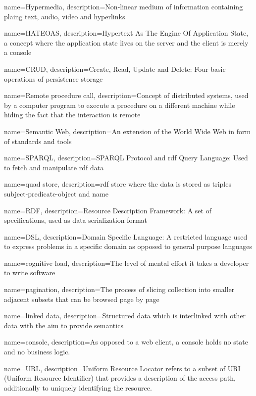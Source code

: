 {
    name={Hypermedia},
    description={Non-linear medium of information containing plaing text, audio, video and hyperlinks}
}

{
    name={HATEOAS},
    description={Hypertext As The Engine Of Application State, a concept where the application state lives on the server and the client is merely a \gls{console}}
}

{
    name={CRUD},
    description={Create, Read, Update and Delete: Four basic operations of persistence storage}
}

{
    name={Remote procedure call},
    description={Concept of distributed systems, used by a computer program to execute a procedure on a different machine while hiding the fact that the interaction is remote}
}

{
    name={Semantic Web},
    description={An extension of the World Wide Web in form of standards and tools}
}

{
    name={SPARQL},
    description={SPARQL Protocol and \gls{rdf} Query Language: Used to fetch and manipulate \gls{rdf} data}
}

{
    name={quad store},
    description={\gls{rdf} store where the data is stored as triples subject-predicate-object and name}
}

{
    name={RDF},
    description={Resource Description Framework: A set of specifications, used as data serialization format}
}

{
    name={DSL},
    description={Domain Specific Language: A restricted language used to express problems in a specific domain as opposed to general purpose languages}
}

{
    name={cognitive load},
    description={The level of mental effort it takes a developer to write software}
}

{
    name={pagination},
    description={The process of slicing collection into smaller adjacent subsets that can be browsed page by page}
}

{
    name={linked data},
    description={Structured data which is interlinked with other data with the aim to provide semantics}
}

{
    name={console},
    description={As opposed to a web client, a console holds no state and no business logic.}
}

{
    name={URL},
    description={Uniform Resource Locator refers to a subset of URI (Uniform Resource Identifier) that provides a description of the access path, additionally to uniquely identifying the resource.}
}
